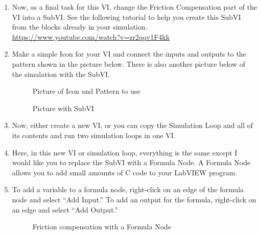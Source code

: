 \documentclass[11pt]{article}
\begin{document}
\begin{enumerate}
\begin{figure}[H]
{                sub-network, and a Build Array feeding the SimTime Waveform
                graph.%
            }
            \caption{Reference VI block diagram}
        \end{figure}
    \item Now, as a final task for this VI, change the Friction Compensation part of the VI into a SubVI. See the following tutorial to help you create this SubVI from the blocks already in your simulation. \url{https://www.youtube.com/watch?v=zr2qqv1F4kk}
    \item Make a simple Icon for your VI and connect the inputs and outputs to the pattern shown in the picture below. There is also another picture below of the simulation with the SubVI.
        \begin{figure}[H]
            \centering
            \caption{Picture of Icon and Pattern to use}
        \end{figure}
        \begin{figure}[H]
            \centering
            \caption{Picture with SubVI}
        \end{figure}
    \item Now, either create a new VI, or you can copy the Simulation Loop and all of its contents and run two simulation loops in one VI.
    \item Here, in this new VI or simulation loop, everything is the same except I would like you to replace the SubVI with a Formula Node. A Formula Node allows you to add small amounts of C code to your LabVIEW program.
    \item To add a variable to a formula node, right-click on an edge of the formula node and select “Add Input.”  To add an output for the formula, right-click on an edge and select “Add Output.”
        \begin{figure}[H]
            \centering
            \caption{Friction compensation with a Formula Node}
        \end{figure}
\end{enumerate}
%
\end{document}
